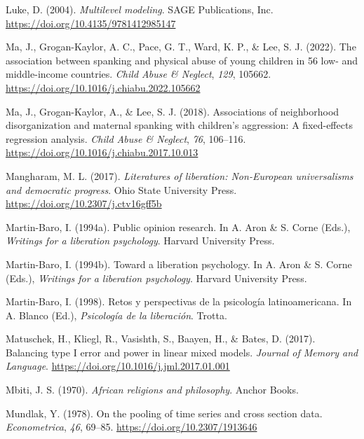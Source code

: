 \documentclass[
  letterpaper,
  DIV=11,
  numbers=noendperiod]{scrreprt}
\newlength{\cslhangindent}
\newenvironment{CSLReferences}[2] %
 {\begin{list}{}{%
  \setlength{\itemindent}{0pt}
  \setlength{\leftmargin}{0pt}
  \setlength{\parsep}{0pt}
  \ifodd #1
   \setlength{\leftmargin}{\cslhangindent}
   \setlength{\itemindent}{-1\cslhangindent}
  \fi
  \setlength{\itemsep}{#2\baselineskip}}}
 {\end{list}}
\begin{document}
\begin{CSLReferences}{1}{0}
Luke, D. (2004). \emph{Multilevel modeling}. SAGE Publications, Inc.
\url{https://doi.org/10.4135/9781412985147}

Ma, J., Grogan-Kaylor, A. C., Pace, G. T., Ward, K. P., \& Lee, S. J.
(2022). {The association between spanking and physical abuse of young
children in 56 low- and middle-income countries}. \emph{Child Abuse \&
Neglect}, \emph{129}, 105662.
\url{https://doi.org/10.1016/j.chiabu.2022.105662}

Ma, J., Grogan-Kaylor, A., \& Lee, S. J. (2018). Associations of
neighborhood disorganization and maternal spanking with children's
aggression: A fixed-effects regression analysis. \emph{Child Abuse \&
Neglect}, \emph{76}, 106--116.
\url{https://doi.org/10.1016/j.chiabu.2017.10.013}

Mangharam, M. L. (2017). \emph{Literatures of liberation: Non-{E}uropean
universalisms and democratic progress}. Ohio State University Press.
\url{https://doi.org/10.2307/j.ctv16gff5b}

Martin-Baro, I. (1994a). Public opinion research. In A. Aron \& S. Corne
(Eds.), \emph{Writings for a liberation psychology}. Harvard University
Press.

Martin-Baro, I. (1994b). Toward a liberation psychology. In A. Aron \&
S. Corne (Eds.), \emph{Writings for a liberation psychology}. Harvard
University Press.

Martin-Baro, I. (1998). {Retos y perspectivas de la psicología
latinoamericana}. In A. Blanco (Ed.), \emph{Psicología de la
liberación}. Trotta.

Matuschek, H., Kliegl, R., Vasishth, S., Baayen, H., \& Bates, D.
(2017). Balancing type {I} error and power in linear mixed models.
\emph{Journal of Memory and Language}.
\url{https://doi.org/10.1016/j.jml.2017.01.001}

Mbiti, J. S. (1970). \emph{African religions and philosophy}. Anchor
Books.

Mundlak, Y. (1978). On the pooling of time series and cross section
data. \emph{Econometrica}, \emph{46}, 69--85.
\url{https://doi.org/10.2307/1913646}


\end{CSLReferences}
\end{document}
